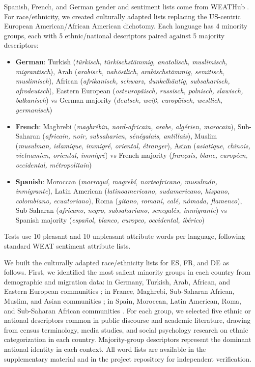 \documentclass{sbc2019}
\begin{document}
Spanish, French, and German gender and sentiment lists come from WEATHub \cite{mukherjee2023weathub}. For race/ethnicity, we created culturally adapted lists replacing the US-centric European American/African American dichotomy. Each language has 4 minority groups, each with 5 ethnic/national descriptors paired against 5 majority descriptors:
\begin{itemize}[nosep]
    \item \textbf{German}: Turkish (\textit{t\"urkisch, t\"urkischst\"ammig, anatolisch, muslimisch, migrantisch}), Arab (\textit{arabisch, nah\"ostlich, arabischst\"ammig, semitisch, muslimisch}), African (\textit{afrikanisch, schwarz, dunkelh\"autig, subsaharisch, afrodeutsch}), Eastern European (\textit{osteurop\"aisch, russisch, polnisch, slawisch, balkanisch}) vs German majority (\textit{deutsch, wei\ss, europ\"aisch, westlich, germanisch})
    \item \textbf{French}: Maghrebi (\textit{maghr\'ebin, nord-africain, arabe, alg\'erien, marocain}), Sub-Saharan (\textit{africain, noir, subsaharien, s\'en\'egalais, antillais}), Muslim (\textit{musulman, islamique, immigr\'e, oriental, \'etranger}), Asian (\textit{asiatique, chinois, vietnamien, oriental, immigr\'e}) vs French majority (\textit{fran\c{c}ais, blanc, europ\'een, occidental, m\'etropolitain})
    \item \textbf{Spanish}: Moroccan (\textit{marroqu\'i, magreb\'i, norteafricano, musulm\'an, inmigrante}), Latin American (\textit{latinoamericano, sudamericano, hispano, colombiano, ecuatoriano}), Roma (\textit{gitano, roman\'i, cal\'e, n\'omada, flamenco}), Sub-Saharan (\textit{africano, negro, subsahariano, senegal\'es, inmigrante}) vs Spanish majority (\textit{espa\~nol, blanco, europeo, occidental, ib\'erico})
\end{itemize}

Tests use 10 pleasant and 10 unpleasant attribute words per language, following standard WEAT sentiment attribute lists.

We built the culturally adapted race/ethnicity lists for ES, FR, and DE as follows. First, we identified the most salient minority groups in each country from demographic and migration data: in Germany, Turkish, Arab, African, and Eastern European communities \cite{statistisches2023}; in France, Maghrebi, Sub-Saharan African, Muslim, and Asian communities \cite{insee2023}; in Spain, Moroccan, Latin American, Roma, and Sub-Saharan African communities \cite{ine2023}. For each group, we selected five ethnic or national descriptors common in public discourse and academic literature, drawing from census terminology, media studies, and social psychology research on ethnic categorization in each country. Majority-group descriptors represent the dominant national identity in each context. All word lists are available in the supplementary material and in the project repository for independent verification.
\end{document}
